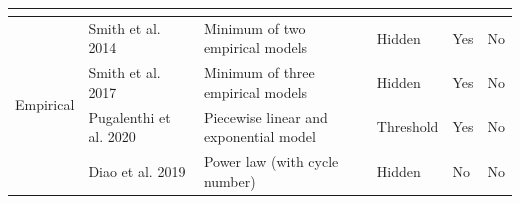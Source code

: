 \documentclass[journal=jpclcd,manuscript=article]{achemso}
\begin{document}
\begin{landscape}
\begin{table}
\begin{tabular}{|l|l|l|l|l|l|l|}
        \multicolumn{7}{c}{}  \\ \hline
        \multicolumn{2}{|l|}{\multirow{4}{*}{Empirical}} & Smith et al. 2014 \cite{smith_models_2014} & Minimum of two empirical models & Hidden & Yes & No \\ \cline{3-7} %
        \multicolumn{2}{|l|}{} & Smith et al. 2017 \cite{smith_life_2017} & Minimum of three empirical models & Hidden & Yes & No \\ \cline{3-7} %
        \multicolumn{2}{|l|}{} & Pugalenthi et al. 2020 \cite{pugalenthi_piecewise_2020} & Piecewise linear and exponential model & Threshold & Yes & No \\ \cline{3-7} %
        \multicolumn{2}{|l|}{} & Diao et al. 2019 \cite{diao_accelerated_2019} & Power law (with cycle number) & Hidden & No & No \\ \hline
    \end{tabular}
\end{table}

\end{landscape}
 \restoregeometry
\end{document}
